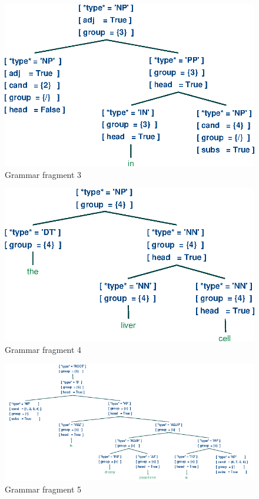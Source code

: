 \documentclass[a4paper]{article}
\begin{document}
\begin{figure}[h]
    \begin{center}
        \includegraphics[scale=0.5]{3.eps}
    \end{center}
    \caption{Grammar fragment 3}
\end{figure}
\begin{figure}[h]
    \begin{center}
        \includegraphics[scale=0.5]{4.eps}
    \end{center}
    \caption{Grammar fragment 4}
\end{figure}
\begin{figure}[h]
    \begin{center}
        \includegraphics[scale=0.5]{5.png}
    \end{center}
    \caption{Grammar fragment 5}
\end{figure}
\end{document}
